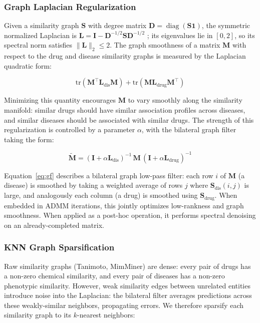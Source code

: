 \documentclass[webpdf,modern,large]{oup-authoring-template}
\newcommand{\tr}{\mathrm{tr}}
\begin{document}
\subsubsection{Graph Laplacian Regularization}

Given a similarity graph $\mathbf{S}$ with degree matrix $\mathbf{D} = \operatorname{diag}(\mathbf{S}\mathbf{1})$, the symmetric normalized Laplacian is $\mathbf{L} = \mathbf{I} - \mathbf{D}^{-1/2} \mathbf{S} \mathbf{D}^{-1/2}$ \cite{chung1997}; its eigenvalues lie in $[0, 2]$, so its spectral norm satisfies $\|\mathbf{L}\|_2 \le 2$. The graph smoothness of a matrix $\mathbf{M}$ with respect to the drug and disease similarity graphs is measured by the Laplacian quadratic form:

\begin{equation}
\tr(\mathbf{M}^\top \mathbf{L}_{\text{dis}} \mathbf{M}) + \tr(\mathbf{M} \mathbf{L}_{\text{drug}} \mathbf{M}^\top)
\label{eq:smoothness}
\end{equation}

Minimizing this quantity encourages $\mathbf{M}$ to vary smoothly along the similarity manifold: similar drugs should have similar association profiles across diseases, and similar diseases should be associated with similar drugs. The strength of this regularization is controlled by a parameter $\alpha$, with the bilateral graph filter taking the form:

\begin{equation}
\tilde{\mathbf{M}} = (\mathbf{I} + \alpha \mathbf{L}_{\text{dis}})^{-1}
\, \mathbf{M} \,
(\mathbf{I} + \alpha \mathbf{L}_{\text{drug}})^{-1}
\label{eq:gf}
\end{equation}

Equation~\eqref{eq:gf} describes a bilateral graph low-pass filter: each row $i$ of $\mathbf{M}$ (a disease) is smoothed by taking a weighted average of rows $j$ where $\mathbf{S}_{\text{dis}}(i,j)$ is large, and analogously each column (a drug) is smoothed using $\mathbf{S}_{\text{drug}}$. When embedded in ADMM iterations, this jointly optimizes low-rankness and graph smoothness. When applied as a post-hoc operation, it performs spectral denoising on an already-completed matrix.

\subsubsection{KNN Graph Sparsification}

Raw similarity graphs (Tanimoto, MimMiner) are dense: every pair of drugs has a non-zero chemical similarity, and every pair of diseases has a non-zero phenotypic similarity. However, weak similarity edges between unrelated entities introduce noise into the Laplacian: the bilateral filter averages predictions across these weakly-similar neighbors, propagating errors. We therefore sparsify each similarity graph to its $k$-nearest neighbors:
\end{document}
